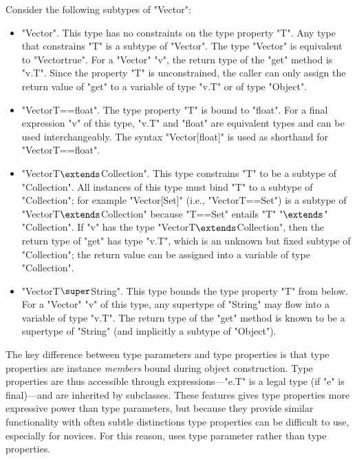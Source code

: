 Consider the following subtypes of \xcd"Vector":
\begin{itemize}
\item \xcd"Vector".  This type has no constraints on the type
property \xcd"T".
Any type that constrains \xcd"T"
is a subtype of \xcd"Vector".  The type \xcd"Vector" is equivalent to
\xcd"Vector{true}".
%
For a \xcd"Vector" \xcd"v", the return type of the \xcd"get" method
is \xcd"v.T".
Since the property \xcd"T" is unconstrained,
the caller can only assign the return value of \xcd"get"
to a variable of type \xcd"v.T" or of type \xcd"Object".

\item \xcd"Vector{T==float}".
The type property \xcd"T" is bound to \xcd"float".
For a final expression \xcd"v" of this type,
\xcd"v.T" and \xcd"float" are equivalent types and can be used
interchangeably.
The syntax \xcd"Vector[float]" is used as
shorthand for \xcd"Vector{T==float}".

\item \xcdmath"Vector{T$\extends$Collection}".
This type constrains \xcd"T" to be a subtype of \xcd"Collection".
All instances of this type must bind \xcd"T" to a subtype of
\xcd"Collection"; for example \xcd"Vector[Set]" (i.e.,
\xcd"Vector{T==Set}") is a subtype of
\xcdmath"Vector{T$\extends$Collection}" because \xcd"T==Set" entails
\xcdmath"T"
\xcdmath"$\extends$"
\xcdmath"Collection".
%
If \xcd"v" has the type \xcdmath"Vector{T$\extends$Collection}",
then the return type of \xcd"get" has type \xcd"v.T", which is an unknown but
fixed subtype of \xcd"Collection"; the return value can be
assigned into a variable of type \xcd"Collection".

\item \xcdmath"Vector{T$\super$String}".  This type bounds the type property
\xcd"T"
from below.  For a \xcd"Vector" \xcd"v" of this type, any
supertype of \xcd"String" may flow into a variable of type \xcd"v.T".
The return type of the \xcd"get"
method is known to be a
supertype of \xcd"String" (and implicitly a subtype of \xcd"Object").
\end{itemize}

\label{sec:usability}
\label{sec:parameters-vs-fields}

The key difference between type parameters and type properties
is that type properties are
instance \emph{members} bound during object construction.  Type
properties are thus accessible through expressions---\xcd"e.T" is
a legal type (if \xcd"e" is final)---and are inherited by subclasses.
These features gives type properties more expressive power than
type parameters, but because they 
provide similar functionality with often subtle distinctions
type properties
can be difficult to use, especially for novices.
For this reason, \Xten uses type parameter rather than type properties.

